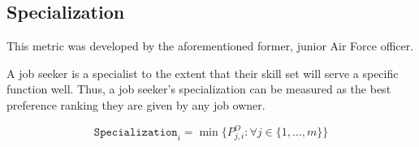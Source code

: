 \subsection{Specialization}

This metric was developed by the aforementioned former, junior Air Force officer.

A job seeker is a specialist to the extent that their skill set will serve a specific function well. Thus, a job seeker's specialization can be measured as the best preference ranking they are given by any job owner.

\[\texttt{Specialization}_i = \min \{P^O_{j,i} : \forall j \in \{1, \dots, m\} \}\]